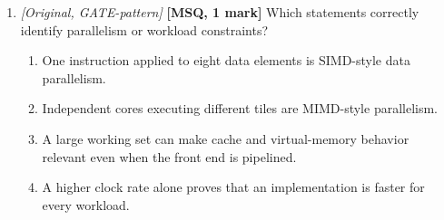 \documentclass[11pt]{article}
\begin{document}
\begin{enumerate}
\item[\textbf{Q8}] \textit{[Original, GATE-pattern]} \textbf{[MSQ, 1 mark]}
Which statements correctly identify parallelism or workload constraints?
\begin{enumerate}
  \item[(A)] One instruction applied to eight data elements is SIMD-style
    data parallelism.
  \item[(B)] Independent cores executing different tiles are MIMD-style
    parallelism.
  \item[(C)] A large working set can make cache and virtual-memory behavior
    relevant even when the front end is pipelined.
  \item[(D)] A higher clock rate alone proves that an implementation is
    faster for every workload.
\end{enumerate}
\end{enumerate}
\end{document}
